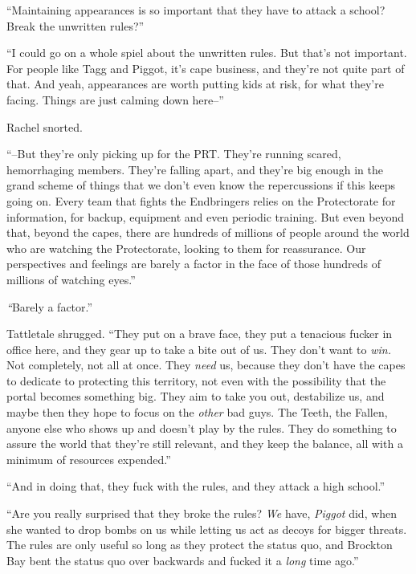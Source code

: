 ``Maintaining appearances is so important that they have to attack a school?  Break the unwritten rules?''



``I could go on a whole spiel about the unwritten rules.  But that's not important.  For people like Tagg and Piggot, it's cape business, and they're not quite part of that.  And yeah, appearances are worth putting kids at risk, for what they're facing.  Things are just calming down here--''



Rachel snorted.



``--But they're only picking up for the PRT.  They're running scared, hemorrhaging members.  They're falling apart, and they're big enough in the grand scheme of things that we don't even know the repercussions if this keeps going on.  Every team that fights the Endbringers relies on the Protectorate for information, for backup, equipment and even periodic training.  But even beyond that, beyond the capes, there are hundreds of millions of people around the world who are watching the Protectorate, looking to them for reassurance.  Our perspectives and feelings are barely a factor in the face of those hundreds of millions of watching eyes.''



\emph{``}Barely a factor.''



Tattletale shrugged.  ``They put on a brave face, they put a tenacious fucker in office here, and they gear up to take a bite out of us.  They don't want to \emph{win. } Not completely, not all at once.\emph{  }They \emph{need} us, because they don't have the capes to dedicate to protecting this territory, not even with the possibility that the portal becomes something big.  They aim to take you out, destabilize us, and maybe then they hope to focus on the \emph{other} bad guys.  The Teeth, the Fallen, anyone else who shows up and doesn't play by the rules.  They do something to assure the world that they're still relevant, and they keep the balance, all with a minimum of resources expended.''



``And in doing that, they fuck with the rules, and they attack a high school.''



``Are you really surprised that they broke the rules?  \emph{We} have, \emph{Piggot} did, when she wanted to drop bombs on us while letting us act as decoys for bigger threats.  The rules are only useful so long as they protect the status quo, and Brockton Bay bent the status quo over backwards and fucked it a \emph{long} time ago.''



